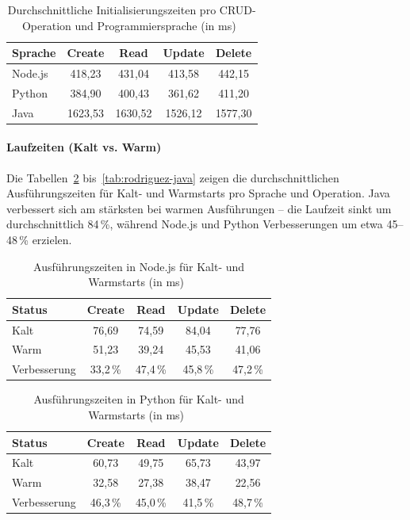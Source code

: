 \begin{table}[H]
\centering
\caption{Durchschnittliche Initialisierungszeiten pro CRUD-Operation und Programmiersprache (in ms)~\cite{Rodriguez2024Evaluation}}
\label{tab:rodriguez-init}
\begin{tabular}{lcccc}
\hline
\textbf{Sprache} & \textbf{Create} & \textbf{Read} & \textbf{Update} & \textbf{Delete} \\
\hline
Node.js & 418,23 & 431,04 & 413,58 & 442,15 \\
Python  & 384,90 & 400,43 & 361,62 & 411,20 \\
Java    & 1623,53 & 1630,52 & 1526,12 & 1577,30 \\
\hline
\end{tabular}
\end{table}

\paragraph{Laufzeiten (Kalt vs. Warm)}
Die Tabellen~\ref{tab:rodriguez-nodejs} bis~\ref{tab:rodriguez-java} zeigen die durchschnittlichen Ausführungszeiten für 
Kalt- und Warmstarts pro Sprache und Operation. Java verbessert sich am stärksten bei warmen Ausführungen – 
die Laufzeit sinkt um durchschnittlich 84\,\%, während Node.js und Python Verbesserungen um etwa 45–48\,\% erzielen.

\begin{table}[H]
\centering
\caption{Ausführungszeiten in Node.js für Kalt- und Warmstarts (in ms)~\cite{Rodriguez2024Evaluation}}
\label{tab:rodriguez-nodejs}
\begin{tabular}{lcccc}
\hline
\textbf{Status} & \textbf{Create} & \textbf{Read} & \textbf{Update} & \textbf{Delete} \\
\hline
Kalt  & 76,69 & 74,59 & 84,04 & 77,76 \\
Warm  & 51,23 & 39,24 & 45,53 & 41,06 \\
Verbesserung & 33,2\,\% & 47,4\,\% & 45,8\,\% & 47,2\,\% \\
\hline
\end{tabular}
\end{table}

\begin{table}[H]
\centering
\caption{Ausführungszeiten in Python für Kalt- und Warmstarts (in ms)~\cite{Rodriguez2024Evaluation}}
\label{tab:rodriguez-python}
\begin{tabular}{lcccc}
\hline
\textbf{Status} & \textbf{Create} & \textbf{Read} & \textbf{Update} & \textbf{Delete} \\
\hline
Kalt  & 60,73 & 49,75 & 65,73 & 43,97 \\
Warm  & 32,58 & 27,38 & 38,47 & 22,56 \\
Verbesserung & 46,3\,\% & 45,0\,\% & 41,5\,\% & 48,7\,\% \\
\hline
\end{tabular}
\end{table}

